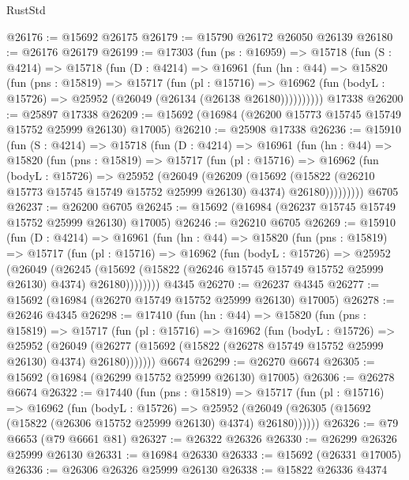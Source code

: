 \begin{lexlean}{RustStd}
\begin{coremodule}
@26176 := @15692 @26175
@26179 := @15790 @26172 @26050 @26139
@26180 := @26176 @26179
@26199 := @17303
    (fun (ps : @16959) =>
    @15718
      (fun (S : @4214) =>
      @15718
        (fun (D : @4214) =>
        @16961
          (fun (hn : @44) =>
          @15820
            (fun (pns : @15819) =>
            @15717
              (fun (pl : @15716) =>
              @16962 (fun (bodyL : @15726) => @25952 (@26049 (@26134 (@26138 @26180))))))))))
    @17338
@26200 := @25897 @17338
@26209 := @15692 (@16984 (@26200 @15773 @15745 @15749 @15752 @25999 @26130) @17005)
@26210 := @25908 @17338
@26236 := @15910
    (fun (S : @4214) =>
    @15718
      (fun (D : @4214) =>
      @16961
        (fun (hn : @44) =>
        @15820
          (fun (pns : @15819) =>
          @15717
            (fun (pl : @15716) =>
            @16962
              (fun (bodyL : @15726) =>
              @25952
                (@26049
                  (@26209
                    (@15692
                      (@15822 (@26210 @15773 @15745 @15749 @15752 @25999 @26130) @4374)
                      @26180)))))))))
    @6705
@26237 := @26200 @6705
@26245 := @15692 (@16984 (@26237 @15745 @15749 @15752 @25999 @26130) @17005)
@26246 := @26210 @6705
@26269 := @15910
    (fun (D : @4214) =>
    @16961
      (fun (hn : @44) =>
      @15820
        (fun (pns : @15819) =>
        @15717
          (fun (pl : @15716) =>
          @16962
            (fun (bodyL : @15726) =>
            @25952
              (@26049
                (@26245
                  (@15692 (@15822 (@26246 @15745 @15749 @15752 @25999 @26130) @4374) @26180))))))))
    @4345
@26270 := @26237 @4345
@26277 := @15692 (@16984 (@26270 @15749 @15752 @25999 @26130) @17005)
@26278 := @26246 @4345
@26298 := @17410
    (fun (hn : @44) =>
    @15820
      (fun (pns : @15819) =>
      @15717
        (fun (pl : @15716) =>
        @16962
          (fun (bodyL : @15726) =>
          @25952
            (@26049
              (@26277 (@15692 (@15822 (@26278 @15749 @15752 @25999 @26130) @4374) @26180)))))))
    @6674
@26299 := @26270 @6674
@26305 := @15692 (@16984 (@26299 @15752 @25999 @26130) @17005)
@26306 := @26278 @6674
@26322 := @17440
    (fun (pns : @15819) =>
    @15717
      (fun (pl : @15716) =>
      @16962
        (fun (bodyL : @15726) =>
        @25952 (@26049 (@26305 (@15692 (@15822 (@26306 @15752 @25999 @26130) @4374) @26180))))))
@26326 := @79 @6653 (@79 @6661 @81)
@26327 := @26322 @26326
@26330 := @26299 @26326 @25999 @26130
@26331 := @16984 @26330
@26333 := @15692 (@26331 @17005)
@26336 := @26306 @26326 @25999 @26130
@26338 := @15822 @26336 @4374

\end{coremodule}
\end{lexlean}
